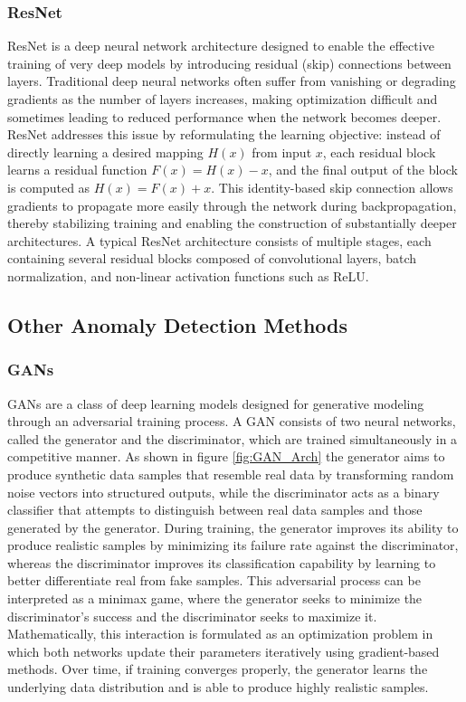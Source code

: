 \subsubsection{\ac{ResNet}}
\ac{ResNet} is a deep neural network architecture designed to enable the effective training of very deep models by introducing residual (skip) connections between layers\cite{he2016resnet}. Traditional deep neural networks often suffer from vanishing or degrading gradients as the number of layers increases, making optimization difficult and sometimes leading to reduced performance when the network becomes deeper. \ac{ResNet} addresses this issue by reformulating the learning objective: instead of directly learning a desired mapping $H(x)$ from input $x$, each residual block learns a residual function $F(x) = H(x) - x$, and the final output of the block is computed as $H(x) = F(x) + x$. This identity-based skip connection allows gradients to propagate more easily through the network during backpropagation, thereby stabilizing training and enabling the construction of substantially deeper architectures. A typical \ac{ResNet} architecture consists of multiple stages, each containing several residual blocks composed of convolutional layers, batch normalization, and non-linear activation functions such as ReLU.

\subsection{Other Anomaly Detection Methods}

\subsubsection{\ac{GANs}}
\ac{GANs} are a class of deep learning models designed for generative modeling through an adversarial training process. A GAN consists of two neural networks, called the generator and the discriminator, which are trained simultaneously in a competitive manner. As shown in figure \ref{fig:GAN_Arch} the generator aims to produce synthetic data samples that resemble real data by transforming random noise vectors into structured outputs, while the discriminator acts as a binary classifier that attempts to distinguish between real data samples and those generated by the generator. During training, the generator improves its ability to produce realistic samples by minimizing its failure rate against the discriminator, whereas the discriminator improves its classification capability by learning to better differentiate real from fake samples. This adversarial process can be interpreted as a minimax game, where the generator seeks to minimize the discriminator’s success and the discriminator seeks to maximize it. Mathematically, this interaction is formulated as an optimization problem in which both networks update their parameters iteratively using gradient-based methods. Over time, if training converges properly, the generator learns the underlying data distribution and is able to produce highly realistic samples.


